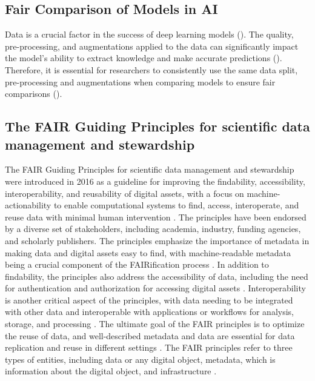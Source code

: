 \subsection{Fair Comparison of Models in AI}

Data is a crucial factor in the success of deep learning models (\cite{lecun2015deep}). The quality, pre-processing, and augmentations applied to the data can significantly impact the model's ability to extract knowledge and make accurate predictions (\cite{shorten2019survey}). Therefore, it is essential for researchers to consistently use the same data split, pre-processing and augmentations when comparing models to ensure fair comparisons (\cite{caton2020fairness,mehrabi2021survey, leakage-recrisis}).


\subsection{The FAIR Guiding Principles for scientific data management and stewardship }
The FAIR Guiding Principles for scientific data management and stewardship were introduced in 2016 as a guideline for improving the findability, accessibility, interoperability, and reusability of digital assets, with a focus on machine-actionability to enable computational systems to find, access, interoperate, and reuse data with minimal human intervention \cite{wilkinson2016fair}. The principles have been endorsed by a diverse set of stakeholders, including academia, industry, funding agencies, and scholarly publishers. The principles emphasize the importance of metadata in making data and digital assets easy to find, with machine-readable metadata being a crucial component of the FAIRification process \cite{wilkinson2016fair}. In addition to findability, the principles also address the accessibility of data, including the need for authentication and authorization for accessing digital assets \cite{wilkinson2016fair}. Interoperability is another critical aspect of the principles, with data needing to be integrated with other data and interoperable with applications or workflows for analysis, storage, and processing \cite{wilkinson2016fair}. The ultimate goal of the FAIR principles is to optimize the reuse of data, and well-described metadata and data are essential for data replication and reuse in different settings \cite{wilkinson2016fair}. The FAIR principles refer to three types of entities, including data or any digital object, metadata, which is information about the digital object, and infrastructure \cite{wilkinson2016fair}.

